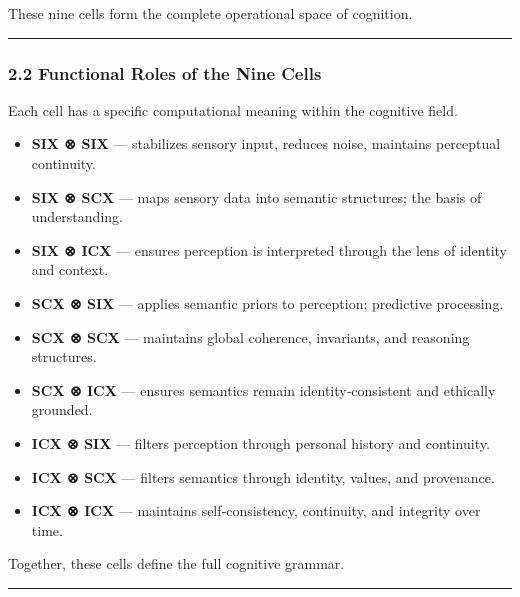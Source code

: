 These nine cells form the complete operational space of cognition.

\begin{center}\rule{0.5\linewidth}{0.5pt}\end{center}

\subsubsection{2.2 Functional Roles of the Nine Cells}\label{functional-roles-of-the-nine-cells}

Each cell has a specific computational meaning within the cognitive field.

\begin{itemize}
\tightlist
\item
  \textbf{SIX ⊗ SIX} --- stabilizes sensory input, reduces noise, maintains perceptual continuity.\\
\item
  \textbf{SIX ⊗ SCX} --- maps sensory data into semantic structures; the basis of understanding.\\
\item
  \textbf{SIX ⊗ ICX} --- ensures perception is interpreted through the lens of identity and context.\\
\item
  \textbf{SCX ⊗ SIX} --- applies semantic priors to perception; predictive processing.\\
\item
  \textbf{SCX ⊗ SCX} --- maintains global coherence, invariants, and reasoning structures.\\
\item
  \textbf{SCX ⊗ ICX} --- ensures semantics remain identity‑consistent and ethically grounded.\\
\item
  \textbf{ICX ⊗ SIX} --- filters perception through personal history and continuity.\\
\item
  \textbf{ICX ⊗ SCX} --- filters semantics through identity, values, and provenance.\\
\item
  \textbf{ICX ⊗ ICX} --- maintains self‑consistency, continuity, and integrity over time.
\end{itemize}

Together, these cells define the full cognitive grammar.

\begin{center}\rule{0.5\linewidth}{0.5pt}\end{center}

